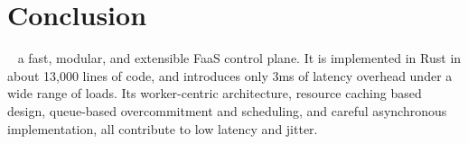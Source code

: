 


\begin{comment}
  \section{Discussion}
There are a number of open-sourced FaaS platforms out there now, so why do we feel the need to make and release yet another?
Nearly all the platforms out there are targeted at end users of FaaS, not built with researchers in mind.
The only one to break this trend is OpenLambda~\cite{hendrickson2016serverless}.
We find it insufficient as it is implemented in Go, whose garbage collection we feel is a significant issue in the latency critical environment of FaaS.
Importantly it lacks both the ability to operate as a cluster and an integrated load generation system, both of which we have implemented both in \sysname~.

OpenFaas~\cite{openfaas} and nuclio~\cite{nuclio} both rely on Docker/Kubernetes as their deployment and scaling mechanisms.
These existing tech stacks are highly useful, but limit the research possibilities of a platform, e.g. cold start optimizations and deploying to edge nodes become intractable.
While \sysname~ does have a Docker implementation, it is to showcase the ability implement multiple containerization mechanisms and compare between them.

OpenWhisk~\cite{openwhisk} also relies on a Docker/Kubernetes setup, and has we have shown above has highly unpredictable performance.
The JVM garbage collection, plus high latency variance coming from both their custom platform pieces and third-party CouchDB and Kafka detract from its capability as a research platform.
We have eliminated the third party services from the invocation path, and our design and Rust implementation contribute to the low-overhead low-variance of the platform.
\end{comment}

\section{Conclusion}
\sysname~ a fast, modular, and extensible FaaS control plane. 
It is implemented in Rust in about 13,000 lines of code, and introduces only 3ms of latency overhead under a wide range of loads.
Its worker-centric architecture, resource caching based design, queue-based overcommitment and scheduling, and careful asynchronous implementation, all contribute to low latency and jitter. 


